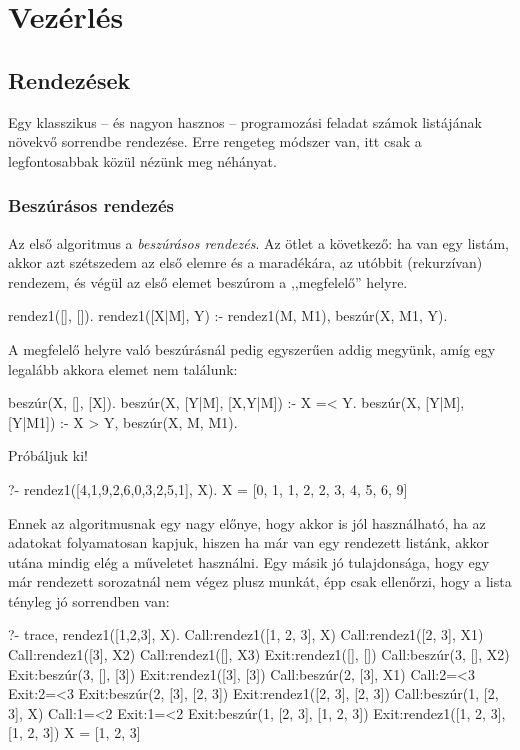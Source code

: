 \chapter{Vezérlés}
\section{Rendezések}
Egy klasszikus -- és nagyon hasznos -- programozási
feladat számok listájának növekvő sorrendbe
rendezése. Erre rengeteg módszer van, itt csak a
legfontosabbak közül nézünk meg néhányat.

\subsection*{Beszúrásos rendezés}
Az első algoritmus a \emph{beszúrásos rendezés}. Az
ötlet a következő: ha van egy listám, akkor azt
szétszedem az első elemre és a maradékára, az
utóbbit (rekurzívan) rendezem, és végül az első
elemet beszúrom a ,,megfelelő'' helyre.
\begin{program}
rendez1([], []).
rendez1([X|M], Y) :-
    rendez1(M, M1), beszúr(X, M1, Y).
\end{program}
A megfelelő helyre való beszúrásnál pedig egyszerűen
addig megyünk, amíg egy legalább akkora elemet nem
találunk:
\begin{program}
beszúr(X, [], [X]).
beszúr(X, [Y|M], [X,Y|M]) :- X =< Y.
beszúr(X, [Y|M], [Y|M1]) :- X > Y, beszúr(X, M, M1).
\end{program}
Próbáljuk ki!
\begin{query}
?- rendez1([4,1,9,2,6,0,3,2,5,1], X).
X = [0, 1, 1, 2, 2, 3, 4, 5, 6, 9]
\end{query}

Ennek az algoritmusnak egy nagy előnye, hogy akkor
is jól használható, ha az adatokat folyamatosan
kapjuk, hiszen ha már van egy rendezett listánk,
akkor utána mindig elég a  műveletet
használni. Egy másik jó tulajdonsága, hogy egy már
rendezett sorozatnál nem végez plusz munkát, épp
csak ellenőrzi, hogy a lista tényleg jó sorrendben
van:
\begin{query}
?- trace, rendez1([1,2,3], X).
Call:rendez1([1, 2, 3], X)
  Call:rendez1([2, 3], X1)
    Call:rendez1([3], X2)
      Call:rendez1([], X3)
      Exit:rendez1([], [])
      Call:beszúr(3, [], X2)
      Exit:beszúr(3, [], [3])
    Exit:rendez1([3], [3])
    Call:beszúr(2, [3], X1)
      Call:2=<3
      Exit:2=<3
    Exit:beszúr(2, [3], [2, 3])
  Exit:rendez1([2, 3], [2, 3])
  Call:beszúr(1, [2, 3], X)
    Call:1=<2
    Exit:1=<2
  Exit:beszúr(1, [2, 3], [1, 2, 3])
Exit:rendez1([1, 2, 3], [1, 2, 3])
X = [1, 2, 3]
\end{query}

